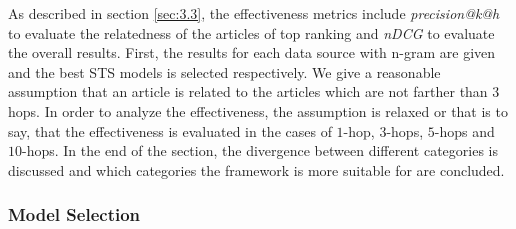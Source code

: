As described in section \ref{sec:3.3}, the effectiveness metrics include \textit{precision@k@h} to evaluate the relatedness of the articles of top ranking and \textit{nDCG} to evaluate the overall results. First, the results for each data source with n-gram are given and the best STS models is selected respectively. We give a reasonable assumption that an article is related to the articles which are not farther than $3$ hops. In order to analyze the effectiveness, the assumption is relaxed or that is to say, that the effectiveness is evaluated in the cases of $1$-hop, $3$-hops, $5$-hops and $10$-hops. In the end of the section, the divergence between different categories is discussed and which categories the framework is more suitable for are concluded.  

\subsubsection{Model Selection}



